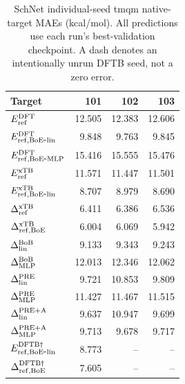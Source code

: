 \begin{table}[H]
\centering
\scriptsize
\setlength{\tabcolsep}{4pt}
\renewcommand{\arraystretch}{1.35}
\caption{SchNet individual-seed tmqm native-target MAEs (kcal/mol). All predictions use each run's best-validation checkpoint. A dash denotes an intentionally unrun DFTB seed, not a zero error.}
\begin{tabular}{lrrr}
\toprule
Target & 101 & 102 & 103 \\
\midrule
\(E_{\rm ref}^{\rm DFT}\) & 12.505 & 12.383 & 12.606 \\
\(E_{\rm ref,BoE\mbox{-}lin}^{\rm DFT}\) & 9.848 & 9.763 & 9.845 \\
\(E_{\rm ref,BoE\mbox{-}MLP}^{\rm DFT}\) & 15.416 & 15.555 & 15.476 \\
\(E_{\rm ref}^{\rm xTB}\) & 11.571 & 11.447 & 11.501 \\
\(E_{\rm ref,BoE\mbox{-}lin}^{\rm xTB}\) & 8.707 & 8.979 & 8.690 \\
\(\Delta^{\rm xTB}_{\rm ref}\) & 6.411 & 6.386 & 6.536 \\
\(\Delta^{\rm xTB}_{\rm ref,BoE}\) & 6.004 & 6.069 & 5.942 \\
\(\Delta^{\rm BoB}_{\rm lin}\) & 9.133 & 9.343 & 9.243 \\
\(\Delta^{\rm BoB}_{\rm MLP}\) & 12.013 & 12.346 & 12.062 \\
\(\Delta^{\rm PRE}_{\rm lin}\) & 9.721 & 10.853 & 9.809 \\
\(\Delta^{\rm PRE}_{\rm MLP}\) & 11.427 & 11.467 & 11.515 \\
\(\Delta^{\rm PRE+A}_{\rm lin}\) & 9.637 & 10.947 & 9.699 \\
\(\Delta^{\rm PRE+A}_{\rm MLP}\) & 9.713 & 9.678 & 9.717 \\
\(E_{\rm ref,BoE\mbox{-}lin}^{\rm DFTB\dagger}\) & 8.773 & -- & -- \\
\(\Delta^{\rm DFTB\dagger}_{\rm ref,BoE}\) & 7.605 & -- & -- \\
\bottomrule
\end{tabular}
\end{table}
